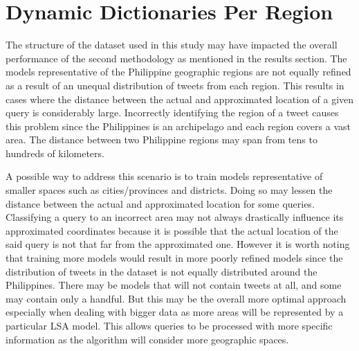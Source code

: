 \section{Dynamic Dictionaries Per Region}
The structure of the dataset used in this study may have impacted the overall performance of the second methodology as mentioned in
the results section. The models representative of the Philippine geographic regions are not equally refined as a result of an unequal distribution of tweets from each region. This results in cases where the distance between the actual and approximated 
location of a given query is considerably large. Incorrectly identifying the region of a tweet causes this problem since the Philippines is an archipelago and each region covers a vast area. The distance between two Philippine regions may span from tens to hundreds of kilometers.

A possible way to address this scenario is to train models representative of smaller spaces such as cities/provinces and districts. Doing so may lessen the distance between the actual and approximated location for some queries. Classifying a query to an incorrect area may not always drastically influence its approximated coordinates because it is possible that the actual location of the said query is not that far from the approximated one. However it is worth noting that training more models would result in more poorly refined models since the distribution of tweets in the dataset is not equally distributed around the Philippines. There may be models that will not contain tweets at all, and some may contain only a handful. But this may be the overall more optimal approach especially when dealing with bigger data as more areas will be represented by a particular LSA model. This allows queries to be processed with more specific information as the algorithm will consider more geographic spaces.
